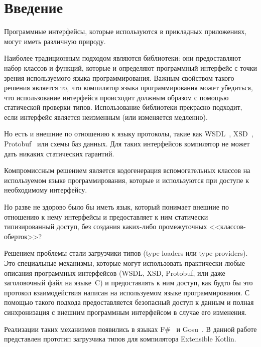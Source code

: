 \clearpage
\section*{Введение}

Программные интерфейсы, которые используются в прикладных приложениях, могут иметь различную природу.

Наиболее традиционным подходом являются библиотеки: они предоставляют набор классов и функций, которые и определяют программный интерфейс с точки зрения используемого языка программирования.
Важным свойством такого решения является то, что компилятор языка программирования может убедиться, что использование интерфейса происходит должным образом с помощью статической проверки типов.
Использование библиотеки прекрасно подходит, если интерфейс является неизменным (или изменяется медленно).

Но есть и внешние по отношению к языку протоколы, такие как WSDL~\cite{wsdl}, XSD~\cite{xsd1, xsd2}, Protobuf~\cite{protobuf} или схемы баз данных. Для таких интерфейсов компилятор не может дать никаких статических гарантий.

Компромиссным решением является кодогенерация вспомогательных классов на используемом языке программирования, которые и используются при доступе к необходимому интерфейсу.

Но разве не здорово было бы иметь язык, который понимает внешние по отношению к нему интерфейсы и предоставляет к ним статически типизированный доступ, без создания каких-либо промежуточных <<классов-оберток>>?

Решением проблемы стали загрузчики типов (type loaders или type providers). Это специальные механизмы, которые могут использовать практически любые описания программных интерфейсов
(WSDL, XSD, Protobuf, или даже заголовочный файл на языке~C) и предоставлять к ним доступ, как будто бы это протокол взаимодействия написан на используемом языке программирования.
С помощью такого подхода предоставляется безопасный доступ к данным и полная синхронизация с внешним программным интерфейсом в случае его изменения.

Реализации таких механизмов появились в языках F\#~\cite{fsharp2010expert} и Gosu~\cite{gosuguide}. В данной работе представлен прототип загрузчика типов для компилятора Extensible Kotlin.

\clearpage